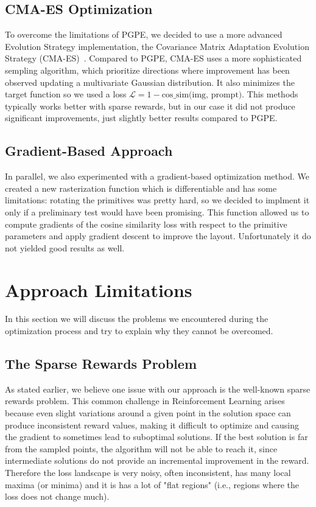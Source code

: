 \documentclass{article}
\begin{document}
\subsection{CMA-ES Optimization}
To overcome the limitations of PGPE, we decided to use a more advanced Evolution Strategy implementation, the Covariance Matrix Adaptation Evolution Strategy (CMA-ES)~\cite{hansen1996adapting}.
Compared to PGPE, CMA-ES uses a more sophisticated sempling algorithm, which prioritize directions where improvement has been observed updating a multivariate Gaussian distribution. It also minimizes the target function so we used a loss $\mathcal{L} = 1 - \text{cos\_sim(img, prompt)}$.
This methods typically works better with sparse rewards, but in our case it did not produce significant improvements, just slightly better results compared to PGPE.

\subsection{Gradient-Based Approach}
In parallel, we also experimented with a gradient-based optimization method. We created a new rasterization function which is differentiable and has some limitations: rotating the primitives was pretty hard, so we decided to implment it only if a preliminary test would have been promising. This function allowed us to compute gradients of the cosine similarity loss with respect to the primitive parameters and apply gradient descent to improve the layout.
Unfortunately it do not yielded good results as well.


\section{Approach Limitations}
In this section we will discuss the problems we encountered during the optimization process and try to explain why they cannot be overcomed.

\subsection{The Sparse Rewards Problem}
As stated earlier, we believe one issue with our approach is the well-known sparse rewards problem. This common challenge in Reinforcement Learning arises because even slight variations around a given point in the solution space can produce inconsistent reward values, making it difficult to optimize and causing the gradient to sometimes lead to suboptimal solutions.
If the best solution is far from the sampled points, the algorithm will not be able to reach it, since intermediate solutions do not provide an incremental improvement in the reward.
Therefore the loss landscape is very noisy, often inconsistent, has many local maxima (or minima) and it is has a lot of "flat regions" (i.e., regions where the loss does not change much).
\end{document}
